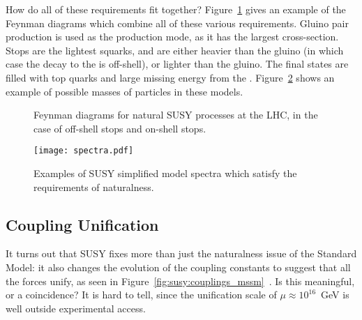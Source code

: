 
How do all of these requirements fit together? Figure~\ref{fig:susy:gtt} gives an example of the Feynman diagrams which combine all of these various requirements. Gluino pair production is used as the production mode, as it has the largest cross-section. Stops are the lightest squarks, and are either heavier than the gluino (in which case the decay to the \lsp is off-shell), or lighter than the gluino. The final states are filled with top quarks and large missing energy from the \lsp. Figure~\ref{fig:susy:spectra} shows an example of possible masses of particles in these models.



\begin{figure}
\centering
{}
\caption{Feynman diagrams for natural SUSY processes at the LHC, in the case of off-shell stops and on-shell stops.}
\label{fig:susy:gtt}
\end{figure}




\begin{figure}
\centering
\texttt{[image: spectra.pdf]}
\caption{Examples of SUSY simplified model spectra which satisfy the requirements of naturalness.}
\label{fig:susy:spectra}
\end{figure}





\subsection{Coupling Unification}


It turns out that SUSY fixes more than just the naturalness issue of the Standard Model: it also changes the evolution of the coupling constants to suggest that all the forces unify, as seen in Figure~\ref{fig:susy:couplings_mssm}~\cite{susypheno,SUSYUnification}. Is this meaningful, or a coincidence? It is hard to tell, since the unification scale of $\mu \approx 10^{16}$~GeV is well outside experimental access.

